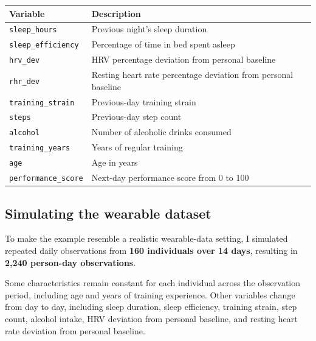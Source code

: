 \documentclass[
  letterpaper,
  DIV=11,
  numbers=noendperiod]{scrreprt}
\newcounter{none} %
\begin{document}
{\def\LTcaptype{none} %
\begin{longtable}[]{@{}
  >{\raggedright\arraybackslash}p{}
  >{\raggedright\arraybackslash}p{}@{}}
\toprule\noalign{}
\begin{minipage}[b]{\linewidth}\raggedright
Variable
\end{minipage} & \begin{minipage}[b]{\linewidth}\raggedright
Description
\end{minipage} \\
\midrule\noalign{}
\endhead
\bottomrule\noalign{}
\endlastfoot
\texttt{sleep\_hours} & Previous night's sleep duration \\
\texttt{sleep\_efficiency} & Percentage of time in bed spent asleep \\
\texttt{hrv\_dev} & HRV percentage deviation from personal baseline \\
\texttt{rhr\_dev} & Resting heart rate percentage deviation from
personal baseline \\
\texttt{training\_strain} & Previous-day training strain \\
\texttt{steps} & Previous-day step count \\
\texttt{alcohol} & Number of alcoholic drinks consumed \\
\texttt{training\_years} & Years of regular training \\
\texttt{age} & Age in years \\
\texttt{performance\_score} & Next-day performance score from 0 to
100 \\
\end{longtable}
}

\subsection{Simulating the wearable
dataset}\label{simulating-the-wearable-dataset}

To make the example resemble a realistic wearable-data setting, I
simulated repeated daily observations from \textbf{160 individuals over
14 days}, resulting in \textbf{2,240 person-day observations}.

Some characteristics remain constant for each individual across the
observation period, including age and years of training experience.
Other variables change from day to day, including sleep duration, sleep
efficiency, training strain, step count, alcohol intake, HRV deviation
from personal baseline, and resting heart rate deviation from personal
baseline.
\end{document}
